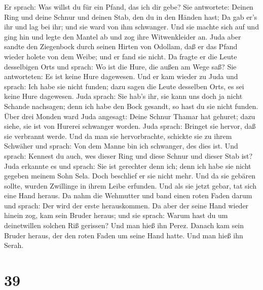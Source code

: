  Er sprach: Was willst du für ein Pfand, das ich dir gebe?
Sie antwortete: Deinen Ring und deine Schnur und deinen Stab, den du in
den Händen hast; Da gab er's ihr und lag bei ihr; und sie ward von ihm
schwanger.  Und sie machte sich auf und ging hin und legte
den Mantel ab und zog ihre Witwenkleider an.  Juda aber
sandte den Ziegenbock durch seinen Hirten von Odollam, daß er das Pfand
wieder holete von dem Weibe; und er fand sie nicht.  Da
fragte er die Leute desselbigen Orts und sprach: Wo ist die Hure, die
außen am Wege saß? Sie antworteten: Es ist keine Hure dagewesen.
 Und er kam wieder zu Juda und sprach: Ich habe sie nicht
funden; dazu sagen die Leute desselben Orts, es sei keine Hure
dagewesen.  Juda sprach: Sie hab's ihr, sie kann uns doch
ja nicht Schande nachsagen; denn ich habe den Bock gesandt, so hast du
sie nicht funden.  Über drei Monden ward Juda angesagt:
Deine Schnur Thamar hat gehuret; dazu siehe, sie ist von Hurerei
schwanger worden. Juda sprach: Bringet sie hervor, daß sie verbrannt
werde.  Und da man sie hervorbrachte, schickte sie zu ihrem
Schwäher und sprach: Von dem Manne bin ich schwanger, des dies ist. Und
sprach: Kennest du auch, wes dieser Ring und diese Schnur und dieser
Stab ist?  Juda erkannte es und sprach: Sie ist gerechter
denn ich; denn ich habe sie nicht gegeben meinem Sohn Sela. Doch
beschlief er sie nicht mehr.  Und da sie gebären sollte,
wurden Zwillinge in ihrem Leibe erfunden.  Und als sie
jetzt gebar, tat sich eine Hand heraus. Da nahm die Wehmutter und band
einen roten Faden darum und sprach: Der wird der erste herauskommen.
 Da aber der seine Hand wieder hinein zog, kam sein Bruder
heraus; und sie sprach: Warum hast du um deinetwillen solchen Riß
gerissen? Und man hieß ihn Perez.  Danach kam sein Bruder
heraus, der den roten Faden um seine Hand hatte. Und man hieß ihn Serah.

\hypertarget{section-38}{%
\section{39}\label{section-38}}

